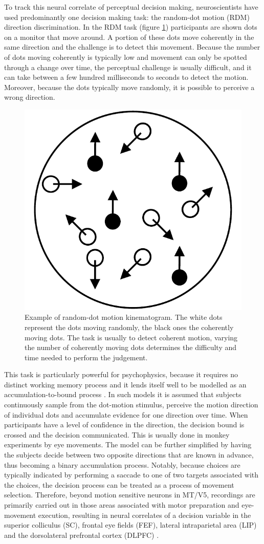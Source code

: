 To track this neural correlate of perceptual decision making, neuroscientists have used predominantly one decision making task: the random-dot motion (RDM) direction discrimination. In the RDM task (figure \ref{fig:RDMtask}) participants are shown dots on a monitor that move around. A portion of these dots move coherently in the same direction and the challenge is to detect this movement. Because the number of dots moving coherently is typically low and movement can only be spotted through a change over time, the perceptual challenge is usually difficult, and it can take between a few hundred milliseconds to seconds to detect the motion. Moreover, because the dots typically move randomly, it is possible to perceive a wrong direction.

\begin{figure}[t]
\centering
\includegraphics[width=.3\textwidth]{figures/RDM_task.png}
\caption{Example of random-dot motion kinematogram. The white dots represent the dots moving randomly, the black ones the coherently moving dots. The task is usually to detect coherent motion, varying the number of coherently moving dots determines the difficulty and time needed to perform the judgement.}
\label{fig:RDMtask}
\end{figure}

This task is particularly powerful for psychophysics, because it requires no distinct working memory process and it lends itself well to be modelled as an accumulation-to-bound process \parencite{OConnell2018}. In such models it is assumed that subjects continuously sample from the dot-motion stimulus, perceive the motion direction of individual dots and accumulate evidence for one direction over time. When participants have a level of confidence in the direction, the decision bound is crossed and the decision communicated. This is usually done in monkey experiments by eye movements. The model can be further simplified by having the subjects decide between two opposite directions that are known in advance, thus becoming a binary accumulation process. Notably, because choices are typically indicated by performing a saccade to one of two targets associated with the choices, the decision process can be treated as a process of movement selection. Therefore, beyond motion sensitive neurons in MT/V5, recordings are primarily carried out in those areas associated with motor preparation and eye-movement execution, resulting in neural correlates of a decision variable in the superior colliculus (SC), frontal eye fields (FEF), lateral intraparietal area (LIP) and the dorsolateral prefrontal cortex (DLPFC) \parencite[for review see][]{Gold2007}. 

